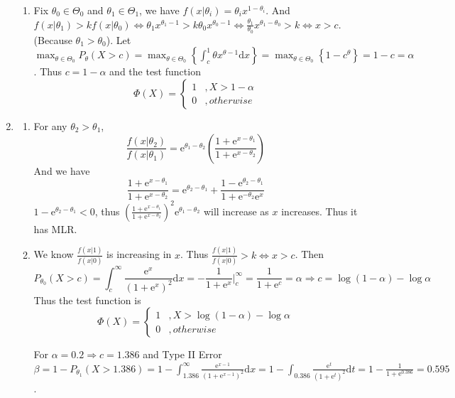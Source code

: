 \documentclass{article}
\begin{document}
\begin{enumerate}[leftmargin = 0 em, label = \arabic*., font = \bfseries]
\begin{enumerate}
		\item 
		Fix $\theta_0 \in \Theta_0$ and $\theta_1 \in \Theta_1$, we have $f(x|\theta_i) = \theta_i x^{1 - \theta_i}$. And $f(x|\theta_1) > k f(x|\theta_0) \iff \theta_1 x^{\theta_1 - 1} > k \theta_0 x^{\theta_0 - 1} \iff \frac{\theta_1}{\theta_0} x^{\theta_1 - \theta_0} > k \iff x > c$. (Because $\theta_1 > \theta_0$). Let $\max_{\theta \in \Theta_0} P_{\theta}(X > c) = \max_{\theta \in \Theta_0}\left\{\int_{c}^1 \theta x^{\theta - 1} \mathrm{d}x\right\} = \max_{\theta \in \Theta_0}\left\{1 - c^\theta\right\} = 1 - c = \alpha$. Thus $c = 1 - \alpha$ and the test function
		\[\Phi(X) = \begin{cases}
			1 & , X > 1 - \alpha\\
			0 & , otherwise
		\end{cases}\]
	\end{enumerate}
		\item 
		\begin{enumerate}
			\item 
		For any $\theta_2 > \theta_1$, 
		\[\frac{f(x|\theta_{2})}{f(x|\theta_1)} = \mathrm{e}^{\theta_1 - \theta_2} \left( \frac{1 + \mathrm{e}^{x - \theta_1}}{1 + \mathrm{e}^{x - \theta_2}}\right)\]
		And we have
		\[\frac{1 + \mathrm{e}^{x - \theta_1}}{1 + \mathrm{e}^{x - \theta_2}} = \mathrm{e}^{\theta_2 - \theta_1} + \frac{1 - \mathrm{e}^{\theta_2 - \theta_1}}{1 + \mathrm{e}^{- \theta_2} \mathrm{e}^x}\]
		$1 - \mathrm{e}^{\theta_2 - \theta_1} < 0$, thus $\left( \frac{1 + \mathrm{e}^{x - \theta_1}}{1 + \mathrm{e}^{x - \theta_2}}\right)^2 \mathrm{e}^{\theta_1 - \theta_2}$ will increase as $x$ increases. Thus it has MLR.
		\item 
		We know $\frac{f(x | 1)}{f(x | 0)}$ is increasing in $x$. Thus $\frac{f(x|1)}{f(x|0)} > k \iff x > c$. Then 
		\[P_{\theta_0}(X > c) = \int_{c}^\infty \frac{\mathrm{e}^x}{ (1 + \mathrm{e}^x)^2} \mathrm{d}x = -\frac{1}{1 + \mathrm{e}^x} \bigg |_{c}^\infty = \frac{1}{1 + \mathrm{e}^c} = \alpha \Rightarrow c = \log(1 - \alpha) - \log \alpha\]
		Thus the test function is 
		\[\Phi(X) = \begin{cases}
			1 & , X > \log (1 - \alpha) - \log \alpha\\
			0 & , otherwise
		\end{cases}\]

		For $\alpha = 0.2 \Rightarrow c = 1.386$ and Type II Error $\beta = 1 - P_{\theta_1}(X > 1.386) = 1 - \int_{1.386}^\infty \frac{\mathrm{e}^{x-1}}{(1 + \mathrm{e}^{x-1})^2} \mathrm{d}x = 1 - \int_{0.386} \frac{\mathrm{e}^t}{(1 + \mathrm{e}^{t})^2} \mathrm{d}t = 1 - \frac{1}{1 + \mathrm{e}^{0.386}} = 0.595$.


\end{enumerate}
\end{enumerate}
\end{document}
